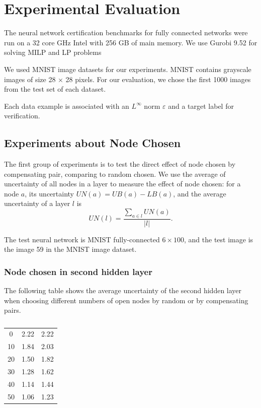 \documentclass{llncs}
\begin{document}
\section{Experimental Evaluation}

The neural network certification benchmarks for fully connected networks were run on a 32 core
GHz Intel with 256 GB of main memory. We use Gurobi 9.52 for solving MILP and LP problems


We used MNIST image datasets for our experiments. MNIST contains grayscale images of size 28 × 28 pixels. For our evaluation, we chose the first
1000 images from the test set of each dataset.

Each data example is associated with an $L^\infty$ norm $\varepsilon$ and a target label
for verification.

\subsection{Experiments about Node Chosen}

The first group of experiments is to test the direct effect of node chosen by compensating pair, comparing to random chosen. We use the average of uncertainty of all nodes in a layer to measure the effect of node chosen: for a node $a$, its uncertainty $UN(a) = UB(a)-LB(a)$, and the average uncertainty of a layer $l$ is $$UN(l) = \dfrac{\sum_{a\in l}UN(a)}{|l|}.$$

The test neural network is MNIST fully-connected $6\times 100$, and the test image is the image 59 in the MNIST image dataset. 

\subsubsection*{Node chosen in second hidden layer}

The following table shows the average uncertainty of the second hidden layer when choosing different numbers of open nodes by random or by compensating pairs.

\begin{table}
	\centering
	\begin{tabular}{c|c|c}

	\text{Number of open nodes}  &  \text{Compensating} & \text{Random}  \\ \hline
	0  &  2.22 & 2.22  \\ \hline
	10  &  1.84 & 2.03  \\ \hline
	20  &  1.50 & 1.82  \\ \hline
	30  &  1.28 & 1.62  \\ \hline
	40  &  1.14 & 1.44  \\ \hline
	50  &  1.06 & 1.23  \\ \hline
\end{tabular}
\caption{}
\label{tab:example0}
\end{table}
\end{document}
